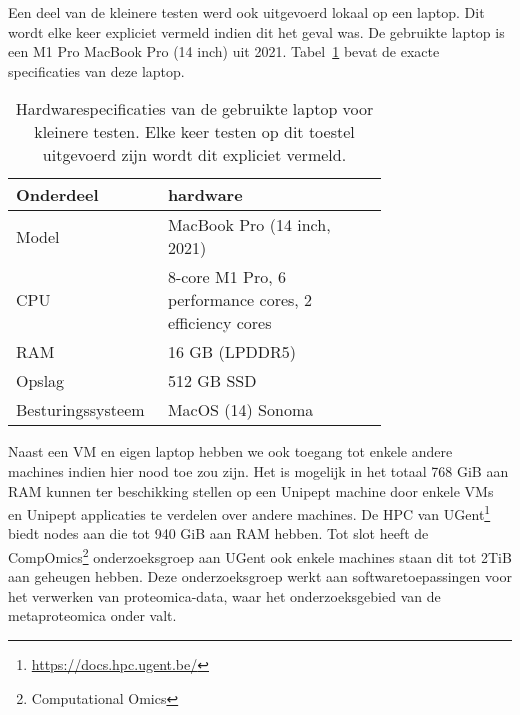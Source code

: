 Een deel van de kleinere testen werd ook uitgevoerd lokaal op een laptop.
Dit wordt elke keer expliciet vermeld indien dit het geval was.
De gebruikte laptop is een M1 Pro MacBook Pro (14 inch) uit 2021.
Tabel~\ref{tab:macbook_hardware} bevat de exacte specificaties van deze laptop.
\\
\begin{table}[h!]
    \centering
    \begin{tabular}{p{0.20\linewidth}p{0.54\linewidth}}
        Onderdeel         & hardware                                               \\
        \hline\hline
        Model             & MacBook Pro (14 inch, 2021)                            \\
        CPU               & 8-core M1 Pro, 6 performance cores, 2 efficiency cores \\
        RAM               & 16 GB (LPDDR5)                                         \\
        Opslag            & 512 GB SSD                                             \\
        Besturingssysteem & MacOS (14) Sonoma                                      \\
        \hline
    \end{tabular}
    \caption{Hardwarespecificaties van de gebruikte laptop voor kleinere testen. Elke keer testen op dit toestel uitgevoerd zijn wordt dit expliciet vermeld.}
    \label{tab:macbook_hardware}
\end{table}

Naast een VM en eigen laptop hebben we ook toegang tot enkele andere machines indien hier nood toe zou zijn.
Het is mogelijk in het totaal 768 GiB aan RAM kunnen ter beschikking stellen op een Unipept machine door enkele VMs en Unipept applicaties te verdelen over andere machines.
De HPC van UGent\footnote{\url{https://docs.hpc.ugent.be/}} biedt nodes aan die tot 940 GiB aan RAM hebben.
Tot slot heeft de CompOmics\footnote{Computational Omics} onderzoeksgroep aan UGent ook enkele machines staan dit tot 2TiB aan geheugen hebben.
Deze onderzoeksgroep werkt aan softwaretoepassingen voor het verwerken van proteomica-data, waar het onderzoeksgebied van de metaproteomica onder valt.
